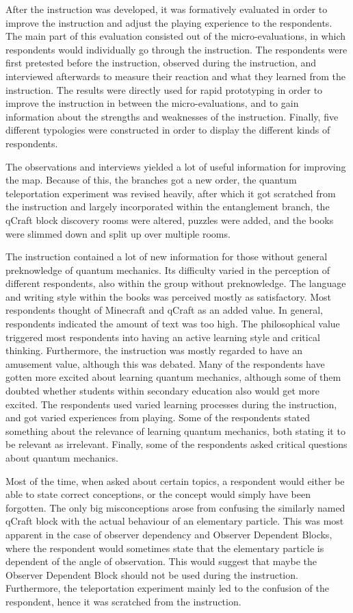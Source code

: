 \documentclass[11pt,twoside]{report} %
\begin{document}
After the instruction was developed, it was formatively evaluated in order to improve the instruction and adjust the playing experience to the respondents. The main part of this evaluation consisted out of the micro-evaluations, in which respondents would individually go through the instruction. The respondents were first pretested before the instruction, observed during the instruction, and interviewed afterwards to measure their reaction and what they learned from the instruction. The results were directly used for rapid prototyping in order to improve the instruction in between the micro-evaluations, and to gain information about the strengths and weaknesses of the instruction. Finally, five different typologies were constructed in order to display the different kinds of respondents.

The observations and interviews yielded a lot of useful information for improving the map. Because of this, the branches got a new order, the quantum teleportation experiment was revised heavily, after which it got scratched from the instruction and largely incorporated within the entanglement branch, the qCraft block discovery rooms were altered, puzzles were added, and the books were slimmed down and split up over multiple rooms.

The instruction contained a lot of new information for those without general preknowledge of quantum mechanics. Its difficulty varied in the perception of different respondents, also within the group without preknowledge. The language and writing style within the books was perceived mostly as satisfactory. Most respondents thought of Minecraft and qCraft as an added value. In general, respondents indicated the amount of text was too high. The philosophical value triggered most respondents into having an active learning style and critical thinking. Furthermore, the instruction was mostly regarded to have an amusement value, although this was debated. Many of the respondents have gotten more excited about learning quantum mechanics, although some of them doubted whether students within secondary education also would get more excited. The respondents used varied learning processes during the instruction, and got varied experiences from playing. Some of the respondents stated something about the relevance of learning quantum mechanics, both stating it to be relevant as irrelevant. Finally, some of the respondents asked critical questions about quantum mechanics.

Most of the time, when asked about certain topics, a respondent would either be able to state correct conceptions, or the concept would simply have been forgotten. The only big misconceptions arose from confusing the similarly named qCraft block with the actual behaviour of an elementary particle. This was most apparent in the case of observer dependency and Observer Dependent Blocks, where the respondent would sometimes state that the elementary particle is dependent of the angle of observation. This would suggest that maybe the Observer Dependent Block should not be used during the instruction. Furthermore, the teleportation experiment mainly led to the confusion of the respondent, hence it was scratched from the instruction.
\end{document}
